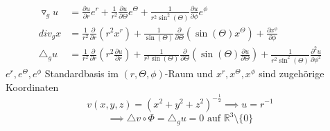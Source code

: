   \begin{example}
    \begin{align*}
      \triangledown_g u &= \frac{\partial u}{\partial r} e^r + \frac{1}{r^2} \frac{\partial u}{\partial \Theta} e^{\Theta} + \frac{1}{r^2 \sin^2(\Theta)} \frac{\partial u}{\partial \phi} e^{\phi}\\
      div_g x &= \frac{1}{r^2} \frac{\partial}{\partial r} (r^2 x^r) + \frac{1}{\sin(\Theta)} \frac{\partial}{\partial \Theta} (\sin(\Theta) x^{\Theta}) + \frac{\partial x^{\phi}}{\partial \phi}\\
      \triangle_g u &= \frac{1}{r^2} \frac{\partial}{\partial r} (r^2 \frac{\partial u}{\partial r})  + \frac{1}{r^2 \sin(\Theta)} \frac{\partial}{\partial \Theta} (\sin(\Theta) \frac{\partial u}{\partial \Theta}) + \frac{1}{r^2 \sin^2(\Theta)} \frac{\partial^2 u}{\partial \phi^2}
    \end{align*}
    $e^r, e^{\Theta}, e^{\phi}$ Standardbasis im $(r, \Theta, \phi)$-Raum und $x^r, x^{\Theta}, x^{\phi}$ sind zugehörige Koordinaten
    $$v(x,y,z) = (x^2 + y^2 + z^2)^{-\frac{1}{2}} \implies u = r^{-1}$$
    $$\implies \triangle v\circ \Phi = \triangle_g u = 0 \text{ auf }\mathbb{R}^3\setminus\{0\}$$
  \end{example}
